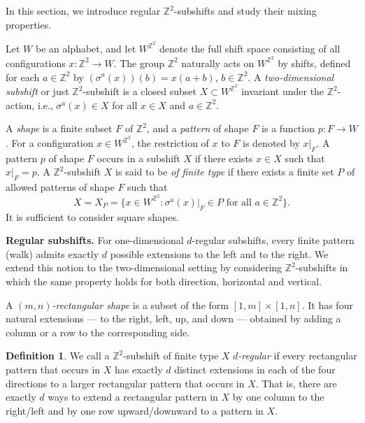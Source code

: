 \documentclass[12pt]{article}
\theoremstyle{definition}
\newtheorem{definition}{Definition}
\begin{document}
In this section, we introduce regular $\mathbb{Z}^2$-subshifts and study their mixing properties.

Let $W$ be an alphabet,  and let $W^{\mathbb{Z}^2}$ denote the full shift space consisting of all configurations $x:\mathbb{Z}^2\rightarrow W$. The group $\mathbb{Z}^2$ naturally acts on $W^{\mathbb{Z}^2}$ by shifts, defined for each $a\in\mathbb{Z}^2$ by $(\sigma^a(x))(b)=x(a+b)$, $b\in\mathbb{Z}^2$.
A \textit{two-dimensional subshift} or just $\mathbb{Z}^2$-subshift is a closed subset $X\subset W^{\mathbb{Z}^2}$ invariant under the $\mathbb{Z}^2$-action, i.e., $\sigma^a(x)\in X$ for all $x\in X$ and $a\in\mathbb{Z}^2$.

A \textit{shape} is a finite subset $F$ of $\mathbb{Z}^2$, and a \textit{pattern} of shape $F$ is a function $p:F\rightarrow W$. For a configuration $x\in W^{\mathbb{Z}^2}$, the restriction of $x$ to $F$ is denoted by $x|_F$. A pattern $p$ of shape $F$ occurs in a subshift $X$ if there exists $x\in X$ such that $x|_F=p$.
A $\mathbb{Z}^2$-subshift $X$ is said to be \textit{of finite type} if there exists a finite set $P$ of allowed patterns of shape $F$ such that
\[
X=X_P=\{ x\in W^{\mathbb{Z}^2} : \sigma^a(x)|_F\in P \mbox{ for all $a\in\mathbb{Z}^2$}\}.
\]
It is sufficient to consider square shapes. %

\vspace{0.2cm}
\textbf{Regular subshifts.} For one-dimensional $d$-regular subshifts, every finite pattern (walk) admits exactly $d$ possible extensions to the left and to the right. We extend this notion to the two-dimensional setting by considering $\mathbb{Z}^2$-subshifts in which the same property holds for both direction, horizontal and vertical.

A \textit{$(m,n)$-rectangular shape} is a subset of the form $[1,m]\times[1,n]$. It has four natural extensions --- to the right, left, up, and down --- obtained by adding a column or a row to the corresponding side.

\begin{definition}
We call a $\mathbb{Z}^2$-subshift of finite type $X$ \textit{$d$-regular} if
every rectangular pattern that occurs in $X$ has exactly $d$ distinct extensions in each of the four directions  to a larger rectangular pattern that occurs in $X$. That is, there are exactly $d$ ways to extend
a rectangular pattern in $X$ by one column to the right/left and by one row upward/downward to a pattern in $X$.
\end{definition}
\end{document}
